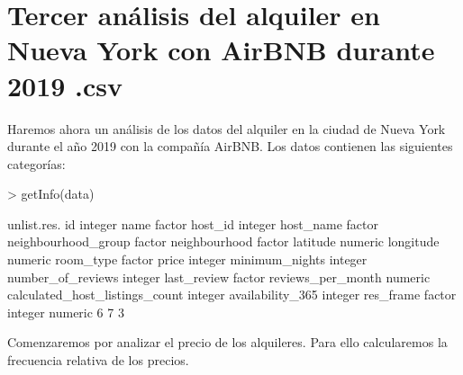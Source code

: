 \documentclass [a4paper] {article}
\begin{document}
\section{Tercer análisis del alquiler en Nueva York con AirBNB durante 2019 .csv}

Haremos ahora un análisis de los datos del alquiler en la ciudad de Nueva York durante el año 2019 con la compañía AirBNB.
Los datos contienen las siguientes categorías:
\begin{Schunk}
\begin{Sinput}
> getInfo(data)
\end{Sinput}
\begin{Soutput}
                               unlist.res.
id                                 integer
name                                factor
host_id                            integer
host_name                           factor
neighbourhood_group                 factor
neighbourhood                       factor
latitude                           numeric
longitude                          numeric
room_type                           factor
price                              integer
minimum_nights                     integer
number_of_reviews                  integer
last_review                         factor
reviews_per_month                  numeric
calculated_host_listings_count     integer
availability_365                   integer
res_frame
 factor integer numeric 
      6       7       3 
\end{Soutput}
\end{Schunk}
Comenzaremos por analizar el precio de los alquileres.
Para ello calcularemos la frecuencia relativa de los precios.
\begin{Schunk}
\end{Schunk}
\end{document}
